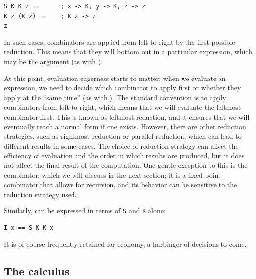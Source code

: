\begin{lstlisting}[style=listingcomb]
S K K z ==      ; x -> K, y -> K, z -> z
K z (K z) ==    ; K z -> z
z
\end{lstlisting}

\noindent
In such cases, combinators are applied from left to right by the first possible reduction.  This means that they will bottom out in a particular expression, which may be the argument (as with ).

At this point, evaluation eagerness starts to matter:  when we evaluate an expression, we need to decide which combinator to apply first or whether they apply at the ``same time'' (as with ).  The standard convention is to apply combinators from left to right, which means that we will evaluate the leftmost combinator first.  This is known as leftmost reduction, and it ensures that we will eventually reach a normal form if one exists.  However, there are other reduction strategies, such as rightmost reduction or parallel reduction, which can lead to different results in some cases.  The choice of reduction strategy can affect the efficiency of evaluation and the order in which results are produced, but it does not affect the final result of the computation.  One gentle exception to this is the  combinator, which we will discuss in the next section; it is a fixed-point combinator that allows for recursion, and its behavior can be sensitive to the reduction strategy used.

Similarly,  can be expressed in terms of \texttt{S} and \texttt{K} alone:

\begin{lstlisting}[style=listingcomb]
I x == S K K x
\end{lstlisting}

\noindent
It is of course frequently retained for economy, a harbinger of decisions to come.





\subsection{The  calculus}

